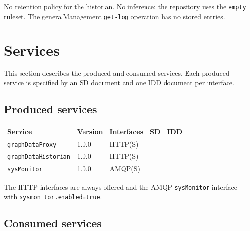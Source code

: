 \documentclass[a4paper]{arrowhead}
\begin{document}
No retention policy for the historian. No inference: the repository uses the \texttt{empty} ruleset. The general\allowbreak{}Management \texttt{get-\allowbreak{}log} operation has no stored entries.

\newpage

\section{Services}
\label{sec:services}

This section describes the produced and consumed services. Each produced service is specified by an SD document and one IDD document per interface.

\subsection{Produced services}

\noindent\begin{longtable}{| p{5.3cm} | p{1.3cm} | p{2.6cm} | p{1.6cm} | p{3.6cm} |} \hline
\rowcolor{gray!33} Service & Version & Interfaces & SD & IDD \\ \hline \endhead
\texttt{graphDataProxy} & 1.0.0 & HTTP(S) & \cite{gdm-graphDataProxy-sd} & \cite{gdm-graphDataProxy-http-idd} \\ \hline
\texttt{graphDataHistorian} & 1.0.0 & HTTP(S) & \cite{gdm-graphDataHistorian-sd} & \cite{gdm-graphDataHistorian-http-idd} \\ \hline
\texttt{sysMonitor} & 1.0.0 & AMQP(S) & \cite{gdm-sysMonitor-sd} & \cite{gdm-sysMonitor-amqp-idd} \\ \hline
\end{longtable}

The HTTP interfaces are always offered and the AMQP \texttt{sysMonitor} interface with \texttt{sysmonitor.enabled=true}.

\subsection{Consumed services}
\end{document}

